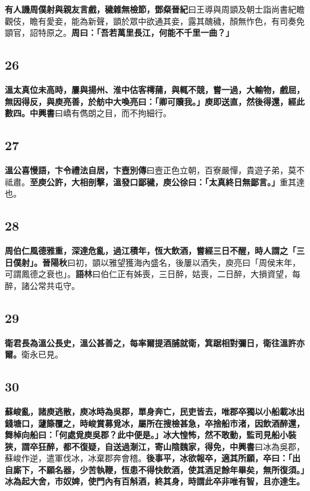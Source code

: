 \textbf{有人譏周僕射與親友言戲，穢雜無檢節，}{\footnotesize \textbf{鄧粲晉紀}曰王導與周顗及朝士詣尚書紀瞻觀伎，瞻有愛妾，能為新聲，顗於眾中欲通其妾，露其醜穢，顏無怍色，有司奏免顗官，詔特原之。}\textbf{周曰：「吾若萬里長江，何能不千里一曲？」}

\subsection*{26}

\textbf{溫太真位未高時，屢與揚州、淮中估客樗蒱，與輒不競，嘗一過，大輸物，戲屈，無因得反，與庾亮善，於舫中大喚亮曰：「卿可贖我。」庾即送直，然後得還，經此數四。}{\footnotesize \textbf{中興書}曰嶠有儁朗之目，而不拘細行。}

\subsection*{27}

\textbf{溫公喜慢語，卞令禮法自居，}{\footnotesize \textbf{卞壼別傳}曰壼正色立朝，百寮嚴憚，貴遊子弟，莫不祗肅。}\textbf{至庾公許，大相剖擊，溫發口鄙穢，庾公徐曰：「太真終日無鄙言。」}{\footnotesize 重其達也。}

\subsection*{28}

\textbf{周伯仁風德雅重，深達危亂，過江積年，恆大飲酒，嘗經三日不醒，時人謂之「三日僕射」。}{\footnotesize \textbf{晉陽秋}曰初，顗以雅望獲海內盛名，後屢以酒失，庾亮曰「周侯末年，可謂鳳德之衰也」。\textbf{語林}曰伯仁正有姊喪，三日醉，姑喪，二日醉，大損資望，每醉，諸公常共屯守。}

\subsection*{29}

\textbf{衛君長為溫公長史，溫公甚善之，每率爾提酒脯就衛，箕踞相對彌日，衛往溫許亦爾。}{\footnotesize 衛永已見。}

\subsection*{30}

\textbf{蘇峻亂，諸庾逃散，庾冰時為吳郡，單身奔亡，民吏皆去，唯郡卒獨以小船載冰出錢塘口，蘧篨覆之，時峻賞募覓冰，屬所在搜檢甚急，卒捨船市渚，因飲酒醉還，舞棹向船曰：「何處覓庾吳郡？此中便是。」冰大惶怖，然不敢動，監司見船小裝狹，謂卒狂醉，都不復疑，自送過淛江，寄山陰魏家，得免，}{\footnotesize \textbf{中興書}曰冰為吳郡，蘇峻作逆，遣軍伐冰，冰棄郡奔會稽。}\textbf{後事平，冰欲報卒，適其所願，卒曰：「出自廝下，不願名器，少苦執鞭，恆患不得快飲酒，使其酒足餘年畢矣，無所復須。」冰為起大舍，市奴婢，使門內有百斛酒，終其身，時謂此卒非唯有智，且亦達生。}

